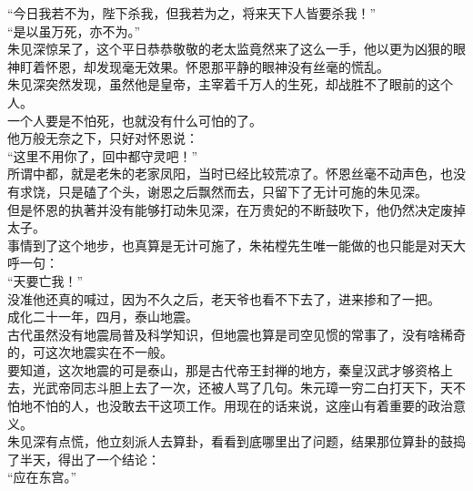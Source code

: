 \begin{multicols}{\theparacolNo}
“今日我若不为，陛下杀我，但我若为之，将来天下人皆要杀我！”\\

“是以虽万死，亦不为。”\\

朱见深惊呆了，这个平日恭恭敬敬的老太监竟然来了这么一手，他以更为凶狠的眼神盯着怀恩，却发现毫无效果。怀恩那平静的眼神没有丝毫的慌乱。\\

朱见深突然发现，虽然他是皇帝，主宰着千万人的生死，却战胜不了眼前的这个人。\\

一个人要是不怕死，也就没有什么可怕的了。\\

他万般无奈之下，只好对怀恩说：\\

“这里不用你了，回中都守灵吧！”\\

所谓中都，就是老朱的老家凤阳，当时已经比较荒凉了。怀恩丝毫不动声色，也没有求饶，只是磕了个头，谢恩之后飘然而去，只留下了无计可施的朱见深。\\

但是怀恩的执著并没有能够打动朱见深，在万贵妃的不断鼓吹下，他仍然决定废掉太子。\\

事情到了这个地步，也真算是无计可施了，朱祐樘先生唯一能做的也只能是对天大呼一句：\\

“天要亡我！”\\

没准他还真的喊过，因为不久之后，老天爷也看不下去了，进来掺和了一把。\\

成化二十一年，四月，泰山地震。\\

古代虽然没有地震局普及科学知识，但地震也算是司空见惯的常事了，没有啥稀奇的，可这次地震实在不一般。\\

要知道，这次地震的可是泰山，那是古代帝王封禅的地方，秦皇汉武才够资格上去，光武帝同志斗胆上去了一次，还被人骂了几句。朱元璋一穷二白打天下，天不怕地不怕的人，也没敢去干这项工作。用现在的话来说，这座山有着重要的政治意义。\\

朱见深有点慌，他立刻派人去算卦，看看到底哪里出了问题，结果那位算卦的鼓捣了半天，得出了一个结论：\\

“应在东宫。”\\


\end{multicols}
